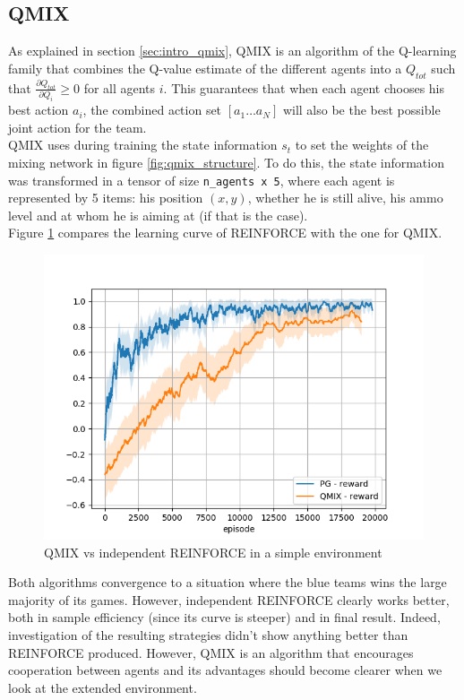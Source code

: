 \subsection{QMIX}
As explained in section \ref{sec:intro_qmix}, QMIX is an algorithm of the Q-learning family that combines the Q-value estimate of the different agents into a $Q_{tot}$ such that $\frac{\partial Q_{tot}}{\partial Q_i} \geq 0$ for all agents $i$. This guarantees that when each agent chooses his best action $a_i$, the combined action set $[a_1 \ldots a_N]$ will also be the best possible joint action for the team.\\
QMIX uses during training the state information $s_t$ to set the weights of the mixing network in figure \ref{fig:qmix_structure}. To do this, the state information was transformed in a tensor of size {\tt n\_agents x 5}, where each agent is represented by 5 items: his position $(x, y)$, whether he is still alive, his ammo level and at whom he is aiming at (if that is the case).\\
Figure \ref{fig:comp_qmix_pg} compares the learning curve of REINFORCE with the one for QMIX.
\begin{figure}[htp]
    \centering
    \includegraphics[width=14cm]{images/experiment5/pg_v_qmix_simple.png}
    \caption{QMIX vs independent REINFORCE in a simple environment}
    \label{fig:comp_qmix_pg}
\end{figure}
Both algorithms convergence to a situation where the blue teams wins the large majority of its games. However, independent REINFORCE clearly works better, both in sample efficiency (since its curve is steeper) and in final result. Indeed, investigation of the resulting strategies didn't show anything better than REINFORCE produced. However, QMIX is an algorithm that encourages cooperation between agents and its advantages should become clearer when we look at the extended environment.\\
